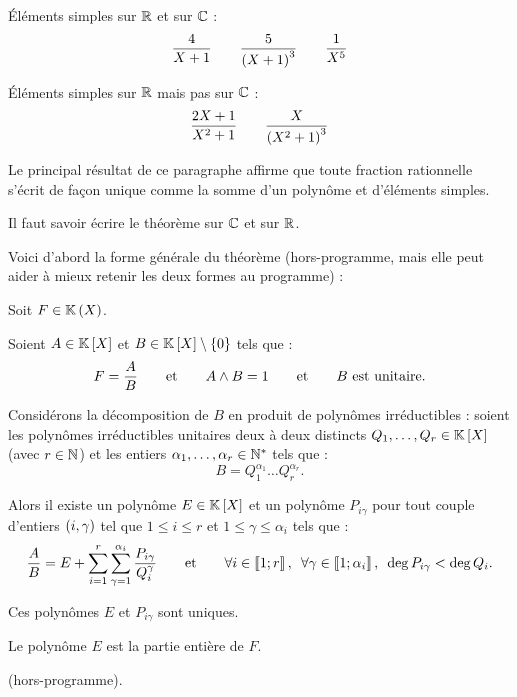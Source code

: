 \begin{ex}
Éléments simples sur \(\mathbb{R}\) et sur \(\mathbb{C}\) : \[\dfrac{4}{X+1}\qquad\dfrac{5}{\left(X+1\right)^3}\qquad\dfrac{1}{X^5}\]

Éléments simples sur \(\mathbb{R}\) mais pas sur \(\mathbb{C}\) : \[\dfrac{2X+1}{X^2+1}\qquad\dfrac{X}{\left(X^2+1\right)^3}\]
\end{ex}

\begin{rem}
Le principal résultat de ce paragraphe affirme que toute fraction rationnelle s'écrit de façon unique comme la somme d'un polynôme et d'éléments simples.

Il faut savoir écrire le théorème sur \(\mathbb{C}\) et sur \(\mathbb{R}\).

Voici d'abord la forme générale du théorème (hors-programme, mais elle peut aider à mieux retenir les deux formes au programme) :
\end{rem}

\begin{theo}
Soit \(F\in\fracrat\).

Soient \(A\in\poly\) et \(B\in\poly\excluant\accol{0}\) tels que : \[F=\dfrac{A}{B}\qquad\text{et}\qquad A\land B=1\qquad\text{et}\qquad B\text{ est unitaire}.\]

Considérons la décomposition de \(B\) en produit de polynômes irréductibles : soient les polynômes irréductibles unitaires deux à deux distincts \(Q_1,\dots,Q_r\in\poly\) (avec \(r\in\mathbb{N}\)) et les entiers \(\alpha_1,\dots,\alpha_r\in\mathbb{N}^*\) tels que : \[B=Q_1^{\alpha_1}\dots Q_r^{\alpha_r}.\]

Alors il existe un polynôme \(E\in\poly\) et un polynôme \(P_{i\gamma}\) pour tout couple d'entiers \(\left(i,\gamma\right)\) tel que \(1\leq i\leq r\) et \(1\leq\gamma\leq\alpha_i\) tels que : \[\dfrac{A}{B}=E+\sum_{i=1}^r\sum_{\gamma=1}^{\alpha_i}\dfrac{P_{i\gamma}}{Q_i^\gamma}\qquad\text{et}\qquad\quantifs{\forall i\in\interventierii{1}{r};\forall\gamma\in\interventierii{1}{\alpha_i}}\deg P_{i\gamma}<\deg Q_i.\]

Ces polynômes \(E\) et \(P_{i\gamma}\) sont uniques.

Le polynôme \(E\) est la partie entière de \(F\).
\end{theo}

\begin{dem}
 (hors-programme).
\end{dem}

